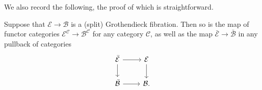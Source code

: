 \documentclass[a4paper,10pt]{article}%
\begin{document}



We also record the following, the proof of which is straightforward.

\begin{proposition}\label{GROTHSTAB PROP}
	Suppose that $\mathcal{E} \to \mathcal{B}$ is a (split) Grothendieck fibration. Then so is the map of functor categories 
	$\mathcal{E}^{\mathcal{C}} \to \mathcal{B}^{\mathcal{C}}$ for any category $\mathcal{C}$,
        as well as the map 
	$\bar{\mathcal{E}} \to \bar{\mathcal{B}}$ in any pullback of categories
        \[
              \begin{tikzcd}
                    \bar{\mathcal{E}} \ar{r} \ar{d} & \mathcal{E} \ar{d}
                    \\
                    \bar{\mathcal{B}} \ar{r} & \mathcal{B}.
              \end{tikzcd}
        \]	
\end{proposition}
\end{document}
